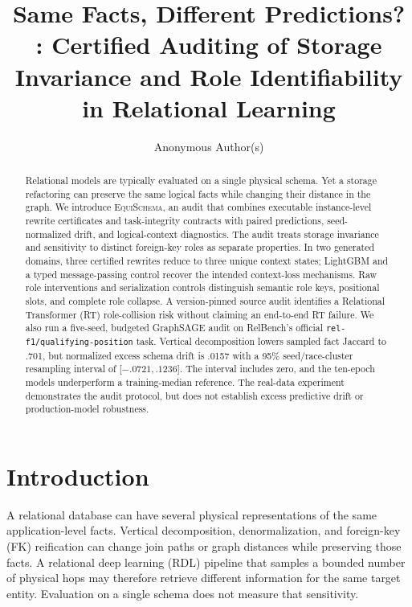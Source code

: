 \documentclass[runningheads]{llncs}
\title{Same Facts, Different Predictions?\\\method: Certified Auditing of Storage Invariance and Role Identifiability in Relational Learning}
\author{Anonymous Author(s)}
\institute{}
\newcommand{\method}{\textsc{EquiSchema}\xspace}
\begin{document}
\maketitle

\begin{abstract}
Relational models are typically evaluated on a single physical schema. Yet a storage refactoring can preserve the same logical facts while changing their distance in the graph. We introduce \method, an audit that combines executable instance-level rewrite certificates and task-integrity contracts with paired predictions, seed-normalized drift, and logical-context diagnostics. The audit treats storage invariance and sensitivity to distinct foreign-key roles as separate properties. In two generated domains, three certified rewrites reduce to three unique context states; LightGBM and a typed message-passing control recover the intended context-loss mechanisms. Raw role interventions and serialization controls distinguish semantic role keys, positional slots, and complete role collapse. A version-pinned source audit identifies a Relational Transformer (RT) role-collision risk without claiming an end-to-end RT failure. We also run a five-seed, budgeted GraphSAGE audit on RelBench's official \texttt{rel-f1/qualifying-position} task. Vertical decomposition lowers sampled fact Jaccard to .701, but normalized excess schema drift is .0157 with a 95\% seed/race-cluster resampling interval of [$-.0721,.1236$]. The interval includes zero, and the ten-epoch models underperform a training-median reference. The real-data experiment demonstrates the audit protocol, but does not establish excess predictive drift or production-model robustness.
\end{abstract}

\section{Introduction}
A relational database can have several physical representations of the same application-level facts. Vertical decomposition, denormalization, and foreign-key (FK) reification can change join paths or graph distances while preserving those facts. A relational deep learning (RDL) pipeline that samples a bounded number of physical hops may therefore retrieve different information for the same target entity. Evaluation on a single schema does not measure that sensitivity.
\end{document}
